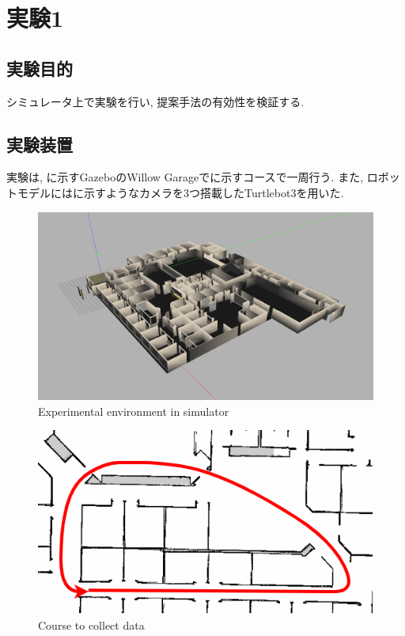 
\section{実験1}
\subsection{実験目的}
シミュレータ上で実験を行い, 提案手法の有効性を検証する.

\subsection{実験装置}
実験は, に示すGazebo\cite{gazebo}のWillow Garage\cite{willow}でに示すコースで一周行う. また, ロボットモデルにはに示すようなカメラを3つ搭載したTurtlebot3\cite{turtlebot3}を用いた. 

\begin{figure}[h]
  \centering
  \includegraphics[keepaspectratio, scale=0.15]{images/gazebo.png}
  \caption{Experimental environment in simulator}
  \label{Fig:gazebo}
  \end{figure}

\begin{figure}[h]
  \centering
  \includegraphics[keepaspectratio, scale=0.5]{images/willow-path.png}
  \caption{Course to collect data}
  \label{Fig:willow-garage}
  \end{figure}

